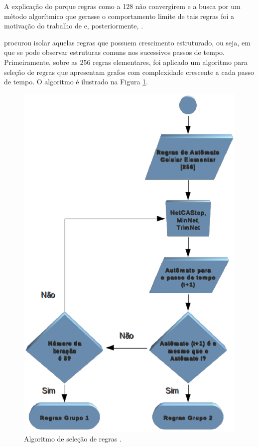\documentclass[12pt,a4paper]{article}
\begin{document}
A explicação do porque regras como a 128 não convergirem e a busca por um
método algorítmico que gerasse o comportamento limite de tais regras foi
a motivação do trabalho de  e, posteriormente,
.

 procurou isolar aquelas regras
que possuem crescimento estruturado, ou seja, em que se pode observar
estruturas comuns nos sucessivos passos de tempo. Primeiramente, sobre as
256 regras elementares, foi aplicado um algoritmo para seleção de regras
que apresentam grafos com complexidade crescente a cada passo de tempo. O
algoritmo é ilustrado na Figura \ref{fig:rulesel}.

\begin{figure}[htp]
\begin{center}
\includegraphics[scale=1.0]{img/rulesel.eps}
\caption{Algoritmo de seleção de regras .}
\label{fig:rulesel}
\end{center}
\end{figure}
\end{document}
